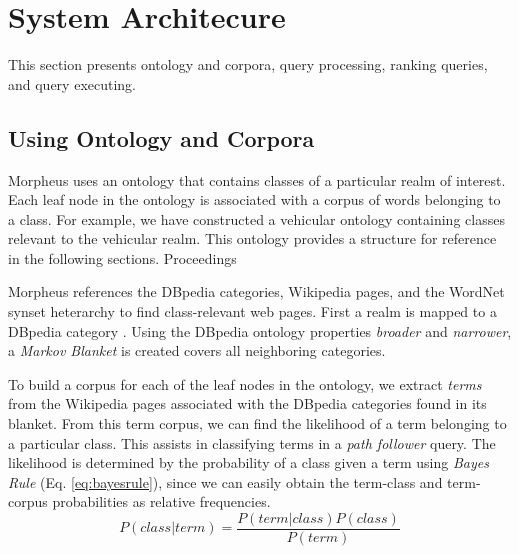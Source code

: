 \section{System Architecure}
\label{sec:systemarch}

This section presents ontology and corpora, query processing, ranking queries, and query executing.

\subsection{Using Ontology and Corpora} 
\label{sec:ontology_corpora}

Morpheus uses an ontology that contains classes of a particular realm of interest. Each leaf node in the ontology is associated with a corpus of words belonging to a class.  For example, we have constructed a vehicular ontology containing classes relevant to the vehicular realm. This ontology provides a structure for reference in the following sections.
Proceedings


Morpheus references the DBpedia categories, Wikipedia pages, and the WordNet synset heterarchy to find class-relevant web pages. First a realm is mapped to a DBpedia category \cite{Bizer2009}. Using the DBpedia ontology properties \emph{broader} and \emph{narrower}, a \emph{Markov Blanket} \cite{PRIS} is created covers all neighboring categories.


To build a corpus for each of the leaf nodes in the ontology, we extract \emph{terms} from the Wikipedia pages associated with the DBpedia categories found in its blanket. From this term corpus, we can find the likelihood of a term belonging to a particular class. This assists in classifying terms in a \emph{path follower} query. The likelihood is determined by the probability of a class given a term using \textit{Bayes Rule} (Eq. \ref{eq:bayesrule}), since we can easily obtain the term-class and term-corpus probabilities as relative frequencies. 
\begin{equation}
\label{eq:bayesrule}
P (class | term) = \frac{P(term | class) P(class)}{P(term)}
\end{equation}    

